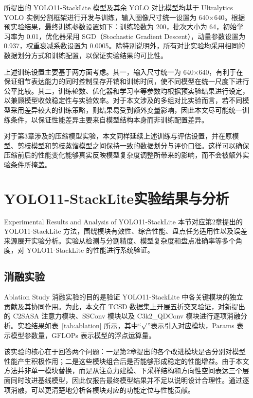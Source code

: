 所提出的 YOLO11-StackLite 模型及其余 YOLO 对比模型均基于 Ultralytics YOLO 实例分割框架进行开发与训练，输入图像尺寸统一设置为 640×640。根据预实验结果，最终训练参数设置如下：训练轮数为 200，批次大小为 64，初始学习率为 0.01，优化器采用 SGD（Stochastic Gradient Descent），动量参数设置为 0.937，权重衰减系数设置为 0.0005。除特别说明外，所有对比实验均采用相同的数据划分方式和训练配置，以保证实验结果的可比性。

上述训练设置主要基于两方面考虑。其一，输入尺寸统一为 640×640，有利于在保证细节表达能力的同时控制显存开销和训练时间，使不同模型在统一尺度下进行公平比较。其二，训练轮数、优化器和学习率等参数均根据预实验结果进行设定，以兼顾模型收敛稳定性与实验效率。对于本文涉及的多组对比实验而言，若不同模型采用差异较大的训练策略，则结果易受到额外变量影响，因此本文尽可能统一训练条件，以保证性能差异主要来自模型结构本身而非训练配置差异。

对于第3章涉及的压缩模型实验，本文同样延续上述训练与评估设置，并在原模型、剪枝模型和剪枝蒸馏模型之间保持一致的数据划分与评价口径。这样可以确保压缩前后的性能变化能够真实反映模型复杂度调整所带来的影响，而不会被额外实验条件所掩盖。

\section{YOLO11-StackLite实验结果与分析}{Experimental Results and Analysis of YOLO11-StackLite}
本节对应第2章提出的 YOLO11-StackLite 方法，围绕模块有效性、综合性能、盘点任务适用性以及误差来源展开实验分析。实验从检测与分割精度、模型复杂度和盘点准确率等多个角度，对 YOLO11-StackLite 的性能进行系统验证。

\subsection{消融实验}{Ablation Study}
消融实验的目的是验证 YOLO11-StackLite 中各关键模块的独立贡献及其协同作用。为此，本文在 TCSD 数据集上开展五折交叉验证，对新提出的 C2SASA 注意力模块、SSConv 模块以及 C3k2\_QDConv 模块进行逐项消融分析。实验结果如表~\ref{tab:ablation} 所示，其中“$\surd$”表示引入对应模块，Params 表示模型参数量，GFLOPs 表示模型的浮点运算量。

该实验的核心在于回答两个问题：一是第2章提出的各个改进模块是否分别对模型性能产生积极作用；二是这些模块组合后是否能够形成稳定的性能增益。由于本文方法并非单一模块替换，而是从注意力建模、下采样结构和方向性空间表达三个层面同时改进基线模型，因此仅报告最终模型结果并不足以说明设计合理性。通过逐项消融，可以更清楚地分析各模块对应的功能定位与性能贡献。

